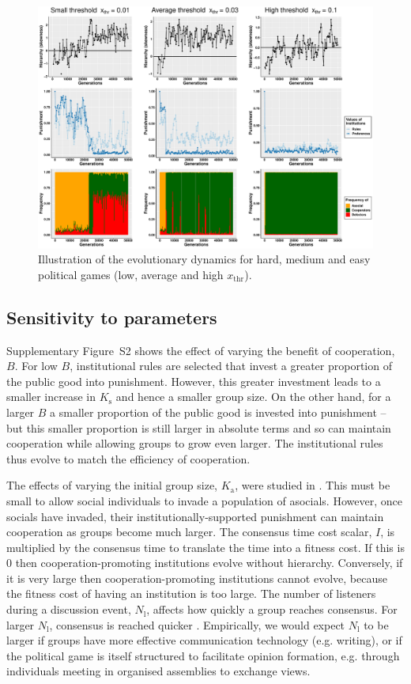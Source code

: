 \documentclass{rstb}
\begin{document}
\begin{linenumbers}
\begin{figure}
    \centering
    \includegraphics[width=0.8\linewidth]{Figures/pt_gen_xThr.pdf}
    \caption{Illustration of the evolutionary dynamics for hard, medium and easy political games (low, average and high $x_\mathrm{thr}$).}
    \label{figGen_xThr}
\end{figure}

\subsection*{Sensitivity to parameters}
Supplementary Figure~S2 shows the effect of varying the benefit of cooperation, $B$. For low $B$, institutional rules are selected that invest a greater proportion of the public good into punishment. However, this greater investment leads to a smaller increase in $K_{\mathrm{s}}$ and hence a smaller group size. On the other hand, for a larger $B$ a smaller proportion of the public good is invested into punishment -- but this smaller proportion is still larger in absolute terms and so can maintain cooperation while allowing groups to grow even larger. The institutional rules thus evolve to match the efficiency of cooperation.

The effects of varying the initial group size, $K_\mathrm{a}$, were studied in \cite{Powers:2013:a}. This must be small to allow social individuals to invade a population of asocials. However, once socials have invaded, their institutionally-supported punishment can maintain cooperation as groups become much larger. The consensus time cost scalar, $I$, is multiplied by the consensus time to translate the time into a fitness cost. If this is 0 then cooperation-promoting institutions evolve without hierarchy. Conversely, if it is very large then cooperation-promoting institutions cannot evolve, because the fitness cost of having an institution is too large. The number of listeners during a discussion event, $N_\mathrm{l}$, affects how quickly a group reaches consensus. For larger $N_\mathrm{l}$, consensus is reached quicker \cite{Perret:2022:a}. Empirically, we would expect $N_\mathrm{l}$ to be larger if groups have more effective communication technology (e.g. writing), or if the political game is itself structured to facilitate opinion formation, e.g. through individuals meeting in organised assemblies to exchange views.  


\end{linenumbers}
\end{document}
